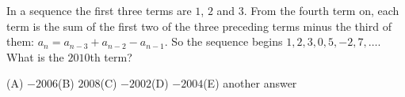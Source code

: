 In a sequence the first three terms are $1$, $2$ and $3$. From the fourth term on, each term is the sum of the first two of the three preceding terms minus the third of them: $a_n=a_{n-3}+a_{n-2}-a_{n-1}$. So the sequence begins $1,2,3,0,5,-2,7,\dots$. What is the $2010$th term?

(A) $-2006$\quad (B) $2008$\quad (C) $-2002$\quad (D) $-2004$\quad (E) another answer
